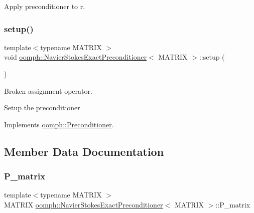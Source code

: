 Apply preconditioner to r. 

\mbox{\label{classoomph_1_1NavierStokesExactPreconditioner_a2879372ba29ceaf57e68f711cd4113aa}} 
\subsubsection{\texorpdfstring{setup()}{setup()}}
{\footnotesize\ttfamily template$<$typename M\+A\+T\+R\+IX $>$ \\
void \hyperlink{classoomph_1_1NavierStokesExactPreconditioner}{oomph\+::\+Navier\+Stokes\+Exact\+Preconditioner}$<$ M\+A\+T\+R\+IX $>$\+::setup (\begin{DoxyParamCaption}{ }\end{DoxyParamCaption})\hspace{0.3cm}{\ttfamily [virtual]}}



Broken assignment operator. 

Setup the preconditioner 

Implements \hyperlink{classoomph_1_1Preconditioner_af4886f4efe510e5c9b0eb19422943588}{oomph\+::\+Preconditioner}.



\subsection{Member Data Documentation}
\mbox{\label{classoomph_1_1NavierStokesExactPreconditioner_ace31a9a18f713467aba137d64dbf764a}} 
\subsubsection{\texorpdfstring{P\+\_\+matrix}{P\_matrix}}
{\footnotesize\ttfamily template$<$typename M\+A\+T\+R\+IX $>$ \\
M\+A\+T\+R\+IX \hyperlink{classoomph_1_1NavierStokesExactPreconditioner}{oomph\+::\+Navier\+Stokes\+Exact\+Preconditioner}$<$ M\+A\+T\+R\+IX $>$\+::P\+\_\+matrix\hspace{0.3cm}{\ttfamily [protected]}}



